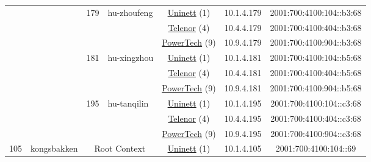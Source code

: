 \begin{small}
\begin{center}
\begin{longtable}{|c|c|c|c|c|c|c|c|}
  &  & \multirow{3}{*}{\tiny{179}} & \multicolumn{1}{|l|}{\multirow{3}{*}{\tiny{hu-zhoufeng}}} & \multicolumn{2}{|c|}{\tiny{\href{https://www.uninett.no}{Uninett} (1)}} & \tiny{10.1.4.179} & \tiny{2001:700:4100:104::b3:68} \\* \cline{5-5}\cline{6-6}\cline{7-7}\cline{8-8}
  &  &  &  & \multicolumn{2}{|c|}{\tiny{\href{https://www.telenor.no}{Telenor} (4)}} & \tiny{10.4.4.179} & \tiny{2001:700:4100:404::b3:68} \\* \cline{5-5}\cline{6-6}\cline{7-7}\cline{8-8}
  &  &  &  & \multicolumn{2}{|c|}{\tiny{\href{http://www.powertech.no}{PowerTech} (9)}} & \tiny{10.9.4.179} & \tiny{2001:700:4100:904::b3:68} \\* \cline{3-3}\cline{4-4}\cline{5-5}\cline{6-6}\cline{7-7}\cline{8-8}
  &  & \multirow{3}{*}{\tiny{181}} & \multicolumn{1}{|l|}{\multirow{3}{*}{\tiny{hu-xingzhou}}} & \multicolumn{2}{|c|}{\tiny{\href{https://www.uninett.no}{Uninett} (1)}} & \tiny{10.1.4.181} & \tiny{2001:700:4100:104::b5:68} \\* \cline{5-5}\cline{6-6}\cline{7-7}\cline{8-8}
  &  &  &  & \multicolumn{2}{|c|}{\tiny{\href{https://www.telenor.no}{Telenor} (4)}} & \tiny{10.4.4.181} & \tiny{2001:700:4100:404::b5:68} \\* \cline{5-5}\cline{6-6}\cline{7-7}\cline{8-8}
  &  &  &  & \multicolumn{2}{|c|}{\tiny{\href{http://www.powertech.no}{PowerTech} (9)}} & \tiny{10.9.4.181} & \tiny{2001:700:4100:904::b5:68} \\* \cline{3-3}\cline{4-4}\cline{5-5}\cline{6-6}\cline{7-7}\cline{8-8}
  &  & \multirow{3}{*}{\tiny{195}} & \multicolumn{1}{|l|}{\multirow{3}{*}{\tiny{hu-tanqilin}}} & \multicolumn{2}{|c|}{\tiny{\href{https://www.uninett.no}{Uninett} (1)}} & \tiny{10.1.4.195} & \tiny{2001:700:4100:104::c3:68} \\* \cline{5-5}\cline{6-6}\cline{7-7}\cline{8-8}
  &  &  &  & \multicolumn{2}{|c|}{\tiny{\href{https://www.telenor.no}{Telenor} (4)}} & \tiny{10.4.4.195} & \tiny{2001:700:4100:404::c3:68} \\* \cline{5-5}\cline{6-6}\cline{7-7}\cline{8-8}
  &  &  &  & \multicolumn{2}{|c|}{\tiny{\href{http://www.powertech.no}{PowerTech} (9)}} & \tiny{10.9.4.195} & \tiny{2001:700:4100:904::c3:68} \\ \hline
 \multirow{30}{*}{\tiny{105}} & \multicolumn{1}{|l|}{\multirow{30}{*}{\tiny{kongsbakken}}} & \multicolumn{2}{|c|}{\multirow{3}{*}{\tiny{Root Context}}} & \multicolumn{2}{|c|}{\tiny{\href{https://www.uninett.no}{Uninett} (1)}} & \tiny{10.1.4.105} & \tiny{2001:700:4100:104::69} \\* \cline{5-5}\cline{6-6}\cline{7-7}\cline{8-8}

\end{longtable}
\end{center}
\end{small}
